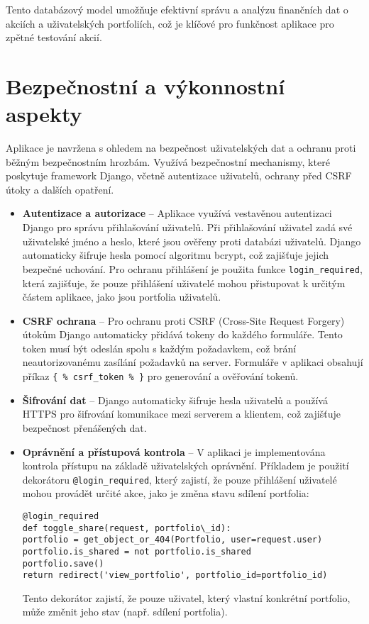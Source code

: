 \documentclass[12pt, a4paper]{report}
\begin{document}
Tento databázový model umožňuje efektivní správu a analýzu finančních dat o akciích a uživatelských portfoliích, což je klíčové pro funkčnost aplikace pro zpětné testování akcií.



\section{Bezpečnostní a výkonnostní aspekty}

Aplikace je navržena s ohledem na bezpečnost uživatelských dat a ochranu proti běžným bezpečnostním hrozbám. Využívá bezpečnostní mechanismy, které poskytuje framework Django, včetně autentizace uživatelů, ochrany před CSRF útoky a dalších opatření.

\begin{itemize}
    \item \textbf{Autentizace a autorizace} – Aplikace využívá vestavěnou autentizaci Django pro správu přihlašování uživatelů. Při přihlašování uživatel zadá své uživatelské jméno a heslo, které jsou ověřeny proti databázi uživatelů. Django automaticky šifruje hesla pomocí algoritmu bcrypt, což zajišťuje jejich bezpečné uchování. Pro ochranu přihlášení je použita funkce \texttt{login\_required}, která zajišťuje, že pouze přihlášení uživatelé mohou přistupovat k určitým částem aplikace, jako jsou portfolia uživatelů.
    
    \item \textbf{CSRF ochrana} – Pro ochranu proti CSRF (Cross-Site Request Forgery) útokům Django automaticky přidává tokeny do každého formuláře. Tento token musí být odeslán spolu s každým požadavkem, což brání neautorizovanému zasílání požadavků na server. Formuláře v aplikaci obsahují příkaz \texttt{\{ \% csrf\_token \% \}} pro generování a ověřování tokenů.
    
    \item \textbf{Šifrování dat} – Django automaticky šifruje hesla uživatelů a používá HTTPS pro šifrování komunikace mezi serverem a klientem, což zajišťuje bezpečnost přenášených dat.
    
    \item \textbf{Oprávnění a přístupová kontrola} – V aplikaci je implementována kontrola přístupu na základě uživatelských oprávnění. Příkladem je použití dekorátoru \texttt{@login\_required}, který zajistí, že pouze přihlášení uživatelé mohou provádět určité akce, jako je změna stavu sdílení portfolia:
    \begin{lstlisting}[style=Python, caption= Login required] 
@login_required
def toggle_share(request, portfolio\_id):
portfolio = get_object_or_404(Portfolio, user=request.user)
portfolio.is_shared = not portfolio.is_shared
portfolio.save()
return redirect('view_portfolio', portfolio_id=portfolio_id)
    \end{lstlisting}
    Tento dekorátor zajistí, že pouze uživatel, který vlastní konkrétní portfolio, může změnit jeho stav (např. sdílení portfolia).
    

\end{itemize}
\end{document}
